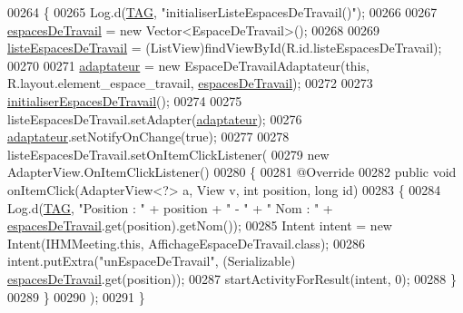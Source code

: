 \begin{DoxyCode}
00264     \{
00265         Log.d(\hyperlink{classcom_1_1lasalle_1_1meeting_1_1_i_h_m_meeting_a239eafcb0ccc896bdba538d1c0f08e65}{TAG}, \textcolor{stringliteral}{"initialiserListeEspacesDeTravail()"});
00266 
00267         \hyperlink{classcom_1_1lasalle_1_1meeting_1_1_i_h_m_meeting_acba41978aec60c27f07db774f9b68b68}{espacesDeTravail} = \textcolor{keyword}{new} Vector<EspaceDeTravail>();
00268 
00269         \hyperlink{classcom_1_1lasalle_1_1meeting_1_1_i_h_m_meeting_ae32ea3420cbe17af0b32df447e326427}{listeEspacesDeTravail} = (ListView)findViewById(R.id.listeEspacesDeTravail);
00270 
00271         \hyperlink{classcom_1_1lasalle_1_1meeting_1_1_i_h_m_meeting_ac103010077163ba43b830ffe524f476d}{adaptateur} = \textcolor{keyword}{new} EspaceDeTravailAdaptateur(\textcolor{keyword}{this}, R.layout.element\_espace\_travail, 
      \hyperlink{classcom_1_1lasalle_1_1meeting_1_1_i_h_m_meeting_acba41978aec60c27f07db774f9b68b68}{espacesDeTravail});
00272 
00273         \hyperlink{classcom_1_1lasalle_1_1meeting_1_1_i_h_m_meeting_ad4660f416b16b6df0f96d58f4c36b6f6}{initialiserEspacesDeTravail}();
00274 
00275         listeEspacesDeTravail.setAdapter(\hyperlink{classcom_1_1lasalle_1_1meeting_1_1_i_h_m_meeting_ac103010077163ba43b830ffe524f476d}{adaptateur});
00276         \hyperlink{classcom_1_1lasalle_1_1meeting_1_1_i_h_m_meeting_ac103010077163ba43b830ffe524f476d}{adaptateur}.setNotifyOnChange(\textcolor{keyword}{true});
00277 
00278         listeEspacesDeTravail.setOnItemClickListener(
00279             \textcolor{keyword}{new} AdapterView.OnItemClickListener()
00280             \{
00281                 @Override
00282                 \textcolor{keyword}{public} \textcolor{keywordtype}{void} onItemClick(AdapterView<?> a, View v, \textcolor{keywordtype}{int} position, \textcolor{keywordtype}{long} \textcolor{keywordtype}{id})
00283                 \{
00284                     Log.d(\hyperlink{classcom_1_1lasalle_1_1meeting_1_1_i_h_m_meeting_a239eafcb0ccc896bdba538d1c0f08e65}{TAG}, \textcolor{stringliteral}{"Position : "} + position + \textcolor{stringliteral}{" - "} + \textcolor{stringliteral}{" Nom : "} + 
      \hyperlink{classcom_1_1lasalle_1_1meeting_1_1_i_h_m_meeting_acba41978aec60c27f07db774f9b68b68}{espacesDeTravail}.get(position).getNom());
00285                     Intent intent = \textcolor{keyword}{new} Intent(IHMMeeting.this, AffichageEspaceDeTravail.class);
00286                     intent.putExtra(\textcolor{stringliteral}{"unEspaceDeTravail"}, (Serializable)
      \hyperlink{classcom_1_1lasalle_1_1meeting_1_1_i_h_m_meeting_acba41978aec60c27f07db774f9b68b68}{espacesDeTravail}.get(position));
00287                     startActivityForResult(intent, 0);
00288                 \}
00289             \}
00290         );
00291     \}
\end{DoxyCode}
